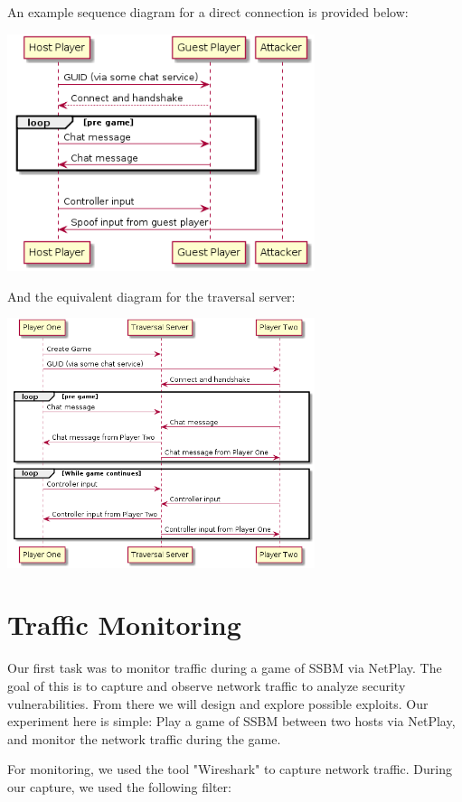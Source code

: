 \documentclass[conference]{IEEEtran}
\begin{document}
An example sequence diagram for a direct connection is provided below:
\begin{center}
\includegraphics[width=9cm]{Figures/Basic_Sequence}
\end{center}
\vspace{0.3cm}
And the equivalent diagram for the traversal server:
\begin{center}
\includegraphics[width=9cm]{Figures/Sequence_Traversal}
\end{center}
\vspace{0.3cm}
\section{Traffic Monitoring}
Our first task was to monitor traffic during a game of SSBM via NetPlay. 
The goal of this is to capture and observe network traffic to analyze security vulnerabilities. 
From there we will design and explore possible exploits.
Our experiment here is simple: Play a game of SSBM between two hosts via NetPlay, and monitor the network traffic during the game.

For monitoring, we used the tool "Wireshark" to capture network traffic. During our capture, we used the following filter:
\end{document}
